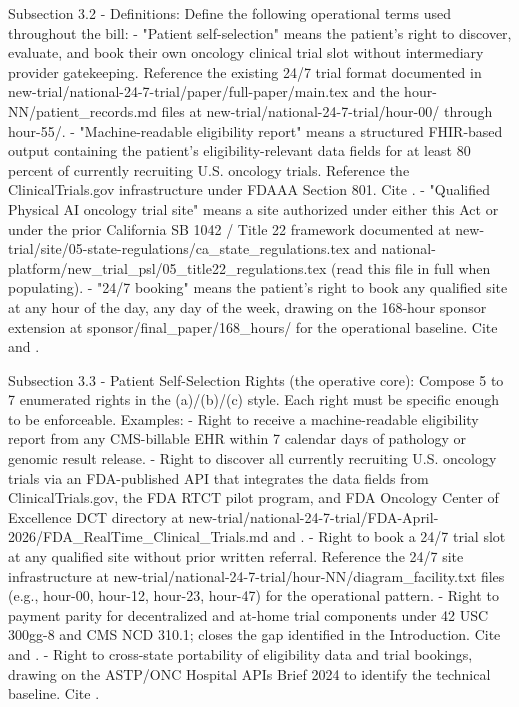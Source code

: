 Subsection 3.2 - Definitions: Define the following operational terms
used throughout the bill:
- "Patient self-selection" means the patient's right to discover,
  evaluate, and book their own oncology clinical trial slot without
  intermediary provider gatekeeping. Reference the existing 24/7 trial
  format documented in
  new-trial/national-24-7-trial/paper/full-paper/main.tex and the
  hour-NN/patient\_records.md files at
  new-trial/national-24-7-trial/hour-00/ through hour-55/.
- "Machine-readable eligibility report" means a structured FHIR-based
  output containing the patient's eligibility-relevant data fields
  for at least 80 percent of currently recruiting U.S. oncology
  trials. Reference the ClinicalTrials.gov infrastructure under FDAAA
  Section 801. Cite \cite{rank5_fdaaa_2007}.
- "Qualified Physical AI oncology trial site" means a site authorized
  under either this Act or under the prior California SB 1042 / Title
  22 framework documented at
  new-trial/site/05-state-regulations/ca\_state\_regulations.tex and
  national-platform/new\_trial\_psl/05\_title22\_regulations.tex (read
  this file in full when populating).
- "24/7 booking" means the patient's right to book any qualified site
  at any hour of the day, any day of the week, drawing on the
  168-hour sponsor extension at
  sponsor/final\_paper/168\_hours/ for the operational baseline. Cite
  \cite{kawchak_2026_19396256} and \cite{kawchak_2026_19994945}.

Subsection 3.3 - Patient Self-Selection Rights (the operative core):
Compose 5 to 7 enumerated rights in the (a)/(b)/(c) style. Each right
must be specific enough to be enforceable. Examples:
- Right to receive a machine-readable eligibility report from any
  CMS-billable EHR within 7 calendar days of pathology or genomic
  result release.
- Right to discover all currently recruiting U.S. oncology trials via
  an FDA-published API that integrates the data fields from
  ClinicalTrials.gov, the FDA RTCT pilot program, and FDA Oncology
  Center of Excellence DCT directory at
  new-trial/national-24-7-trial/FDA-April-2026/FDA\_RealTime\_Clinical\_Trials.md
  and \cite{fda_oce_advancing_oncology_dct_2024}.
- Right to book a 24/7 trial slot at any qualified site without prior
  written referral. Reference the 24/7 site infrastructure at
  new-trial/national-24-7-trial/hour-NN/diagram\_facility.txt files
  (e.g., hour-00, hour-12, hour-23, hour-47) for the operational
  pattern.
- Right to payment parity for decentralized and at-home trial
  components under 42 USC 300gg-8 and CMS NCD 310.1; closes the gap
  identified in the Introduction. Cite
  \cite{usc_300gg8_clinical_trials} and
  \cite{cms_ncd_3101_routine_costs}.
- Right to cross-state portability of eligibility data and trial
  bookings, drawing on the ASTP/ONC Hospital APIs Brief 2024 to
  identify the technical baseline. Cite
  \cite{astp_onc_hospital_apis_2024}.

